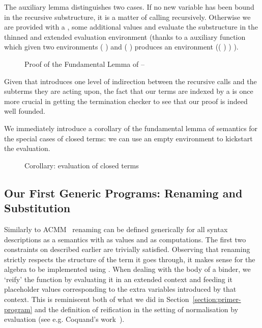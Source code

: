 The auxiliary lemma  distinguishes two cases. If no new
variable has been bound in the recursive substructure, it is
a matter of calling \semfun{} recursively. Otherwise we are provided
with a , some additional values and evaluate the
substructure in the thinned and extended evaluation environment
(thanks to a auxiliary function \AF{\_>>\_} which given two environments
{( )  } and {( )  }
produces an environment {(( \AF{++} ) )  )}.

\begin{figure}[h]
\caption{Proof of the Fundamental Lemma of \semrec{} -- }\label{def:body}
\end{figure}

Given that  introduces one level of indirection between the
recursive calls and the subterms they are acting upon, the fact
that our terms are indexed by a  is once more crucial in
getting the termination checker to see that our proof is indeed
well founded.

We immediately introduce a corollary of the fundamental lemma of semantics
for the special cases of closed terms: we can use an empty environment to
kickstart the evaluation.

\begin{figure}[h]
\caption{Corollary: evaluation of closed terms}\label{fig:evalclosed}
\end{figure}

\subsection{Our First Generic Programs: Renaming and Substitution}\label{section:renandsub}

Similarly to ACMM~\citeyear{allais2017type} renaming can be defined generically
for all syntax descriptions as a semantics with  as values and  as
computations. The first two constraints on  described earlier are trivially
satisfied. Observing that renaming strictly respects the structure of the term it
goes through, it makes sense for the algebra to be implemented using .
When dealing with the body of a binder, we `reify' the  function by
evaluating it in an extended context and feeding it placeholder values corresponding to
the extra variables introduced by that context. This is reminiscent both of what we
did in Section~\ref{section:primer-program} and the definition of reification in
the setting of normalisation by evaluation (see e.g. Coquand's work~\citeyear{coquand2002formalised}).

